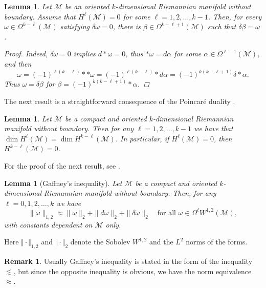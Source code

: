 \documentclass[intlimits,12pt,reqno]{amsart}
\newcommand{\cM}{\mathcal M}
\numberwithin{equation}{section}
\newtheorem{lemma}[theorem]{Lemma}
\theoremstyle{definition}
\newtheorem{remark}[theorem]{Remark}
\begin{document}
\begin{lemma}
\label{T101}
Let $\cM$ be an oriented $k$-dimensional Riemannian manifold without boundary. Assume that $H^\ell(\cM)=0$ for some $\ell=1,2,\ldots,k-1$. Then, for every $\omega\in \Omega^{k-\ell}(\cM)$ satisfying $\delta\omega=0$, there is $\beta\in\Omega^{k-\ell+1}(\cM)$ such that $\delta\beta=\omega$.
\begin{proof}
Indeed, $\delta \omega = 0$ implies $d\ast \omega = 0$, thus $\ast \omega = d\alpha$ for some $\alpha \in \Omega^{\ell-1}(\cM)$, and then 
\[
\omega = (-1)^{\ell(k-\ell)} \ast \ast \omega = (-1)^{\ell(k-\ell)}\ast d\alpha = (-1)^{k(k-\ell+1)}\delta \ast \alpha.
\]
Thus $\omega = \delta \beta$ for $\beta = (-1)^{k(k-\ell+1)} \ast \alpha$.    
\end{proof}
\end{lemma}
The next result is a straightforward consequence of the Poincar\'e duality \cite[Theorem~6.13]{warner}.
\begin{lemma}
\label{T102}
Let $\cM$ be a compact and oriented $k$-dimensional Riemannian manifold without boundary.  Then for any $\ell=1,2,\ldots,k-1$ we have that $\dim H^{\ell}(\cM)=\dim H^{k-\ell}(\cM)$. In particular, if $H^\ell(\cM)=0$, then $H^{k-\ell}(\cM)=0$.
\end{lemma}


For the proof of the next result, see \cite[Theorem~4.8]{ISS99}.
\begin{lemma}[Gaffney's inequality]
\label{la:gaffney}
Let $\cM$ be a compact and oriented $k$-dimensional Riemannian manifold without boundary. 
Then, for any $\ell=0,1,2,\ldots,k$ we have
\[
 \|\omega\|_{1,2}  \approx 
 \|\omega\|_{2} + \|d\omega\|_{2} + \|\delta\omega\|_{2}
 \quad \text{for all } \omega \in\Omega^\ell W^{1,2}(\cM),
\]
with constants dependent on $\cM$ only.
\end{lemma}
Here $\Vert\cdot\Vert_{1,2}$ and $\Vert\cdot\Vert_{2}$ denote the Sobolev $W^{1,2}$ and the $L^2$ norms of the forms.
\begin{remark}
Usually Gaffney's inequality is stated in the form of the inequality $\lesssim$, but since the opposite inequality is obvious, we have the norm equivalence $\approx$.
\end{remark}
\end{document}
